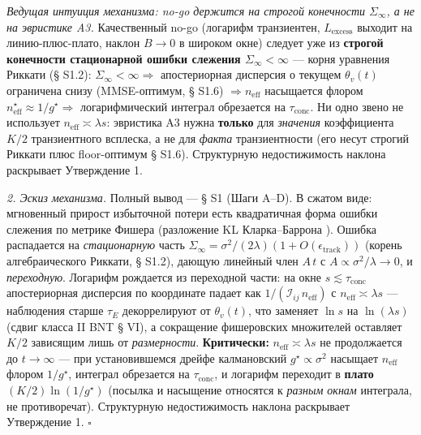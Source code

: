 \documentclass[12pt]{iopart}
\begin{document}
\emph{Ведущая интуиция механизма: no-go держится на строгой конечности \(\Sigma_\infty\), а не на эвристике A3.} Качественный no-go (логарифм транзиентен, \(L_{\text{excess}}\) выходит на линию-плюс-плато, наклон \(B \to 0\) в широком окне) следует уже из \textbf{строгой конечности стационарной ошибки слежения \(\Sigma_\infty < \infty\)} --- корня уравнения Риккати (§ S1.2): \(\Sigma_\infty < \infty \Rightarrow\) апостериорная дисперсия о текущем \(\theta_v(t)\) ограничена снизу (MMSE-оптимум, § S1.6) \(\Rightarrow n_{\text{eff}}\) насыщается флором \(n_{\text{eff}}^\star \approx 1/g^\star \Rightarrow\) логарифмический интеграл обрезается на \(\tau_{\text{conc}}\). Ни одно звено не использует \(n_{\text{eff}} \asymp \lambda s\): эвристика A3 нужна \textbf{только} для \emph{значения} коэффициента \(K/2\) транзиентного всплеска, а не для \emph{факта} транзиентности (его несут строгий Риккати плюс floor-оптимум § S1.6). Структурную недостижимость наклона раскрывает Утверждение 1.



\emph{2. Эскиз механизма.} Полный вывод --- § S1 (Шаги A--D). В сжатом виде: мгновенный прирост избыточной потери есть квадратичная форма ошибки слежения по метрике Фишера (разложение KL Кларка--Баррона \cite{ClarkeBarron1990,Rissanen1986}). Ошибка распадается на \emph{стационарную} часть \(\Sigma_\infty = \sigma^2/(2\lambda)(1+O(\epsilon_{\text{track}}))\) (корень алгебраического Риккати, § S1.2), дающую линейный член \(A\,t\) с \(A\propto\sigma^2/\lambda\to0\), и \emph{переходную}. Логарифм рождается из переходной части: на окне \(s\lesssim\tau_{\text{conc}}\) апостериорная дисперсия по координате падает как \(1/(\mathcal I_{ij}\,n_{\text{eff}})\) с \(n_{\text{eff}}\asymp\lambda s\) --- наблюдения старше \(\tau_E\) декоррелируют от \(\theta_v(t)\), что заменяет \(\ln s\) на \(\ln(\lambda s)\) (сдвиг класса II BNT \cite{BialekNemenmanTishby2001} § VI), а сокращение фишеровских множителей оставляет \(K/2\) зависящим лишь от \emph{размерности}. \textbf{Критически:} \(n_{\text{eff}}\asymp\lambda s\) не продолжается до \(t\to\infty\) --- при установившемся дрейфе калмановский \(g^\star\propto\sigma^2\) насыщает \(n_{\text{eff}}\) флором \(1/g^\star\), интеграл обрезается на \(\tau_{\text{conc}}\), и логарифм переходит в \textbf{плато} \((K/2)\ln(1/g^\star)\) (посылка и насыщение относятся к \emph{разным окнам} интеграла, не противоречат). Структурную недостижимость наклона раскрывает Утверждение 1. \(\square\)
\end{document}
